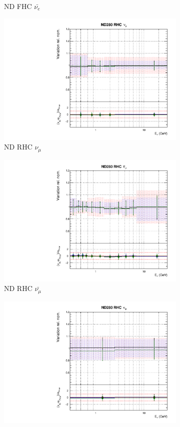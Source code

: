 \begin{figure}
\begin{subfigure}{0.45\textwidth}
  \caption{ND FHC $\bar{\nu_{e}}$}
\end{subfigure}
\begin{subfigure}{0.45\textwidth}
  \centering
  \includegraphics[width=0.75\linewidth]{figs/polyasmvsflux_4}
  \caption{ND RHC $\nu_{\mu}$}
\end{subfigure}
\begin{subfigure}{0.45\textwidth}
  \centering
  \includegraphics[width=0.75\linewidth]{figs/polyasmvsflux_5}
  \caption{ND RHC $\bar{\nu_{\mu}}$}
\end{subfigure}
\begin{subfigure}{0.45\textwidth}
  \centering
  \includegraphics[width=0.75\linewidth]{figs/polyasmvsflux_6}

\end{subfigure}
\end{figure}
